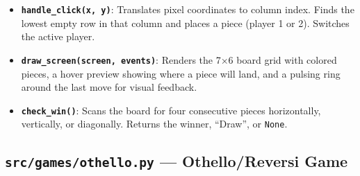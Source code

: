 \documentclass[12pt,a4paper]{article}
\begin{document}
\begin{itemize}
    \item \textbf{\texttt{handle\_click(x, y)}}: Translates pixel coordinates to column index. Finds the lowest empty row in that column and places a piece (player 1 or 2). Switches the active player.
    
    \item \textbf{\texttt{draw\_screen(screen, events)}}: Renders the 7×6 board grid with colored pieces, a hover preview showing where a piece will land, and a pulsing ring around the last move for visual feedback.
    
    \item \textbf{\texttt{check\_win()}}: Scans the board for four consecutive pieces horizontally, vertically, or diagonally. Returns the winner, ``Draw'', or \texttt{None}.
\end{itemize}

\subsection{\texttt{src/games/othello.py} — Othello/Reversi Game}
\end{document}
